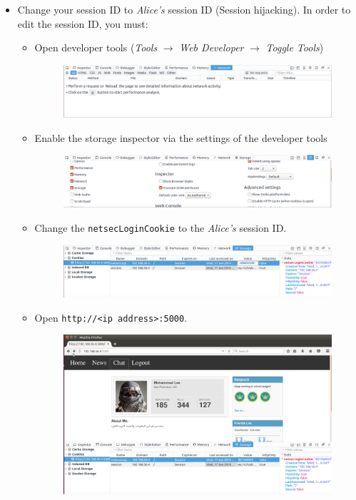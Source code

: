 \documentclass[11pt]{article}
\begin{document}
\begin{itemize}
\item Change your session ID to \textit{Alice's} session ID (Session hijacking). In order to edit the session ID, you must:
\begin{itemize}
	\item Open developer tools (\textit{Tools} $\rightarrow$ \textit{Web Developer} $\rightarrow$ \textit{Toggle Tools})
	\begin{figure}[H]
    \includegraphics[width=\linewidth]{images/developerTools.png}
	\end{figure}
	\item Enable the storage inspector via the settings of the developer tools
	\begin{figure}[H]
    \includegraphics[width=\linewidth]{images/storageEnable.png}
	\end{figure}
	\item Change the \texttt{netsecLoginCookie} to the \textit{Alice's} session ID.
	\begin{figure}[H]
    \includegraphics[width=\linewidth]{images/changeCookie.png}
	\end{figure}
	\item Open \texttt{http://<ip address>:5000}.
	\begin{figure}[H]
    \includegraphics[width=\linewidth]{images/adminPage.png}
	\end{figure}
\end{itemize}


\end{itemize}
\end{document}
